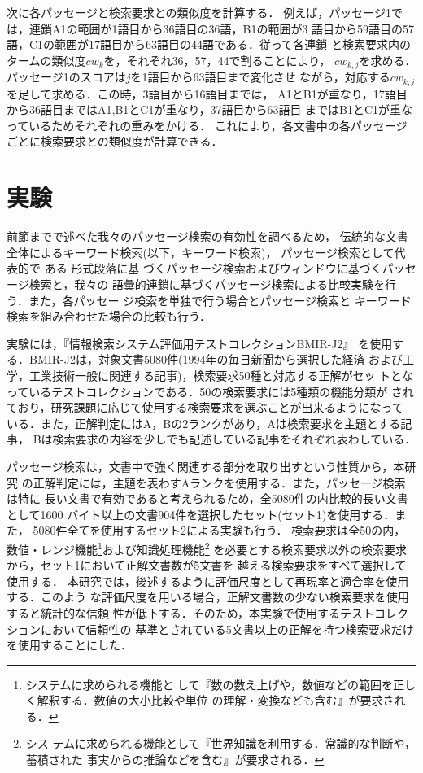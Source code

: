 次に各パッセージと検索要求との類似度を計算する．
例えば，パッセージ1では，連鎖A1の範囲が1語目から36語目の36語，B1の範囲が3
語目から59語目の57語，C1の範囲が17語目から63語目の44語である．従って各連鎖
と検索要求内のタームの類似度$cw_{k}$を，それぞれ36，57，44で割ることにより，
$cw_{k,j}$を求める．パッセージ1のスコアは$j$を1語目から63語目まで変化させ
ながら，対応する$cw_{k,j}$を足して求める．この時，3語目から16語目までは，
A1とB1が重なり，17語目から36語目まではA1,B1とC1が重なり，37語目から63語目
まではB1とC1が重なっているためそれぞれの重みをかける．
これにより，各文書中の各パッセージごとに検索要求との類似度が計算できる．


\section{実験}\label{sec:experiment}
前節までで述べた我々のパッセージ検索の有効性を調べるため，
伝統的な文書全体によるキーワード検索(以下，キーワード検索)，
パッセージ検索として代表的で
ある
形式段落に基
づくパッセージ検索およびウィンドウに基づくパッセージ検索と，我々の
語彙的連鎖に基づくパッセージ検索による比較実験を行う．また，各パッセー
ジ検索を単独で行う場合とパッセージ検索と
キーワード検索を組み合わせた場合の比較も行う．

実験には，『情報検索システム評価用テストコレクションBMIR-J2』
\cite{BMIR-J2:98j}
を使用する．BMIR-J2は，対象文書5080件(1994年の毎日新聞から選択した経済
および工学，工業技術一般に関連する記事)，検索要求50種と対応する正解がセッ
トとなっているテストコレクションである．50の検索要求には5種類の機能分類が
されており，研究課題に応じて使用する検索要求を選ぶことが出来るようになって
いる．また，正解判定にはA，Bの2ランクがあり，Aは検索要求を主題とする記事，
Bは検索要求の内容を少しでも記述している記事をそれぞれ表わしている．

パッセージ検索は，文書中で強く関連する部分を取り出すという性質から，本研究
の正解判定には，主題を表わすAランクを使用する．また，パッセージ検索は特に
長い文書で有効であると考えられるため，全5080件の内比較的長い文書として1600
バイト以上の文書904件を選択したセット(セット1)を使用する．また，
5080件全てを使用するセット2による実験も行う．
検索要求は全50の内，数値・レンジ機能\footnote{システムに求められる機能と
して『数の数え上げや，数値などの範囲を正しく解釈する．数値の大小比較や単位
の理解・変換なども含む』が要求される．}および知識処理機能\footnote{シス
テムに求められる機能として『世界知識を利用する．常識的な判断や，蓄積された
事実からの推論などを含む』が要求される．}
を必要とする検索要求以外の検索要求から，セット1において正解文書数が5文書を
越える検索要求をすべて選択して使用する．
本研究では，後述するように評価尺度として再現率と適合率を使用する．このよう
な評価尺度を用いる場合，正解文書数の少ない検索要求を使用すると統計的な信頼
性が低下する．そのため，本実験で使用するテストコレクションにおいて信頼性の
基準とされている5文書以上の正解を持つ検索要求だけを使用することにした．

